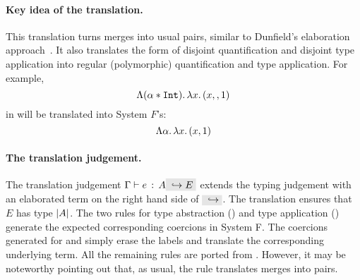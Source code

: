 \paragraph{Key idea of the translation.}
This translation turns merges into usual pairs, similar to Dunfield's
elaboration approach~\cite{dunfield2014elaborating}.
It also translates the form of disjoint quantification and disjoint type application into regular (polymorphic) 
quantification and type application. 
For example, \[ \Lambda (\alpha*\texttt{Int}).\, \lambda x.\, (x ,, 1) \] in \name will be translated into System $F$'s: 
\[ \Lambda \alpha.\, \lambda x.\, (x, 1)\]
\begin{comment}
This is achieved by means of the type-directed translation.
Note that, when performing type application, the type-system will ensure that the type being applied is compatible
with the disjoint constraint, otherwise the program is rejected.
For example, applying the term above to $\tychar$ would be accepted, and the generated term would translate this
into System $F$'s type application.
On the other hand, applying the term to $\tyint$ would be rejected, and hence the target term produced is meaningless.
\end{comment}

\begin{comment}
For example, \[ 1 \mergeop \code{"one"} \] becomes \pair 1
{\code{"one"}}. In usage, the pair will be coerced according to type
information. For example, consider the function application: \[ \app {(\lamty x
\tystring x)} {(1 \mergeop \code{"one"})} \] This expression will be translated to \[ \app
{(\lamty x \tystring x)} {(\app {(\lamty x {\pair \tyint \tystring} {\proj 2 x})}
{\pair 1 {\code{"one"}}})} \] The coercion in this case is $(\lamty x {\pair
\tyint \tystring} {\proj 2 x})$. It extracts the second item from the pair, since
the function expects a $\tystring$ but the translated argument is of type $\pair
\tyint \tystring$.
\end{comment}

\paragraph{The translation judgement.} 
The translation judgement $\jtype \Gamma e A \yields E$ extends the
typing judgement with an elaborated term on the right hand side of
$\yields {}$.  The translation ensures that $E$ has type $\lvert A \rvert$.  
The two rules for type abstraction () and type
application () generate the expected
corresponding coercions in System F.  
The coercions generated for  and  
simply erase the labels and translate the corresponding underlying term. 
All the remaining rules are ported from \oldname. 
However, it may be noteworthy
pointing out that, as usual, the rule 
translates merges into pairs.


